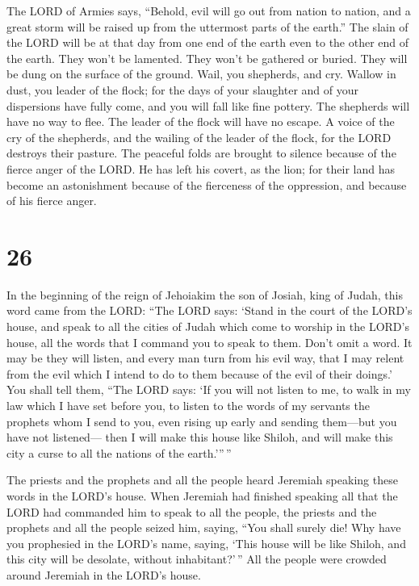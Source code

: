  The LORD of Armies says, ``Behold, evil will go out from
nation to nation, and a great storm will be raised up from the uttermost
parts of the earth.''  The slain of the LORD will be at
that day from one end of the earth even to the other end of the earth.
They won't be lamented. They won't be gathered or buried. They will be
dung on the surface of the ground.  Wail, you shepherds,
and cry. Wallow in dust, you leader of the flock; for the days of your
slaughter and of your dispersions have fully come, and you will fall
like fine pottery.  The shepherds will have no way to
flee. The leader of the flock will have no escape.  A
voice of the cry of the shepherds, and the wailing of the leader of the
flock, for the LORD destroys their pasture.  The peaceful
folds are brought to silence because of the fierce anger of the LORD.
 He has left his covert, as the lion; for their land has
become an astonishment because of the fierceness of the oppression, and
because of his fierce anger.

\hypertarget{section-25}{%
\section{26}\label{section-25}}

 In the beginning of the reign of Jehoiakim the son of
Josiah, king of Judah, this word came from the LORD: 
``The LORD says: `Stand in the court of the LORD's house, and speak to
all the cities of Judah which come to worship in the LORD's house, all
the words that I command you to speak to them. Don't omit a word.
 It may be they will listen, and every man turn from his
evil way, that I may relent from the evil which I intend to do to them
because of the evil of their doings.'  You shall tell
them, ``The LORD says: `If you will not listen to me, to walk in my law
which I have set before you,  to listen to the words of my
servants the prophets whom I send to you, even rising up early and
sending them---but you have not listened---  then I will
make this house like Shiloh, and will make this city a curse to all the
nations of the earth.'''\,''

 The priests and the prophets and all the people heard
Jeremiah speaking these words in the LORD's house.  When
Jeremiah had finished speaking all that the LORD had commanded him to
speak to all the people, the priests and the prophets and all the people
seized him, saying, ``You shall surely die!  Why have you
prophesied in the LORD's name, saying, `This house will be like Shiloh,
and this city will be desolate, without inhabitant?'\,'' All the people
were crowded around Jeremiah in the LORD's house.

